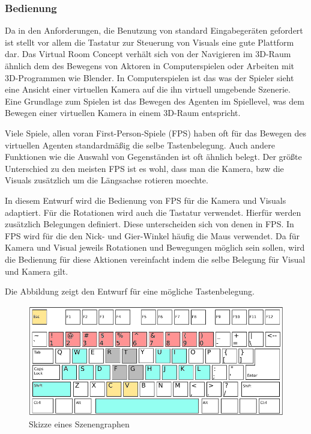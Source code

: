 \subsubsection{Bedienung}

Da in den Anforderungen, die Benutzung von standard Eingabeger\"aten gefordert ist stellt vor allem die
Tastatur zur Steuerung von Visuals eine gute Plattform dar. Das Virtual Room Concept verh\"alt sich von der
Navigieren im 3D-Raum \"ahnlich dem des Bewegens von Aktoren in Computerspielen oder Arbeiten mit 3D-Programmen
wie Blender. In Computerspielen ist das was der Spieler sieht eine Ansicht einer virtuellen Kamera auf die ihn
virtuell umgebende Szenerie. Eine Grundlage zum Spielen ist das Bewegen des Agenten im Spiellevel, was dem 
Bewegen einer virtuellen Kamera in einem 3D-Raum entspricht.

Viele Spiele, allen voran First-Person-Spiele (FPS) haben oft f\"ur das Bewegen des virtuellen Agenten standardm\"a\ss{}ig
die selbe Tastenbelegung. Auch andere Funktionen wie die Auswahl von Gegenst\"anden ist oft \"ahnlich belegt.
Der gr\"o\ss{}te Unterschied zu den meisten FPS ist es wohl, dass man die Kamera, bzw die Visuals zus\"atzlich um die
L\"angsachse rotieren moechte.

In diesem Entwurf wird die Bedienung von FPS f\"ur die Kamera und Visuals adaptiert. F\"ur die Rotationen wird
auch die Tastatur verwendet. Hierf\"ur werden zus\"atzlich Belegungen definiert. Diese unterscheiden sich von
denen in FPS. In FPS wird f\"ur die den Nick- und Gier-Winkel h\"aufig die Maus verwendet. Da f\"ur Kamera und
Visual jeweils Rotationen und Bewegungen m\"oglich sein sollen, wird die Bedienung f\"ur diese Aktionen 
vereinfacht indem die selbe Belegung f\"ur Visual und Kamera gilt.

Die Abbildung zeigt den Entwurf f\"ur eine m\"ogliche Tastenbelegung.

\begin{figure}[h!]
    \centering
    \includegraphics[width=1\textwidth]{pictures/usage_keyboard_layout1.png}
    \caption{Skizze eines Szenengraphen}
\end{figure}

